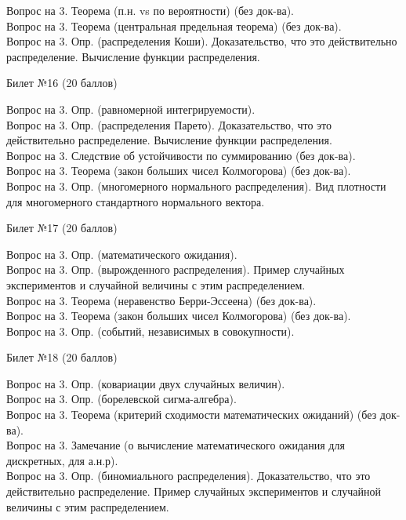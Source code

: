 \documentclass[preview]{standalone}
\begin{document}
Вопрос на 3.  Теорема (п.н. vs по вероятности)  (без док-ва). \\
Вопрос на 3.  Теорема (центральная предельная теорема) (без док-ва). \\
Вопрос на 3.  Опр. (распределения Коши). Доказательство, что это действительно распределение. Вычисление функции распределения. \\
\begin{center} {\Large Билет №16 (20 баллов)} \end{center}
Вопрос на 3.  Опр. (равномерной интегрируемости). \\
Вопрос на 3.  Опр. (распределения Парето). Доказательство, что это действительно распределение. Вычисление функции распределения. \\
Вопрос на 3.  Следствие об устойчивости по суммированию (без док-ва). \\
Вопрос на 3.  Теорема (закон больших чисел Колмогорова) (без док-ва). \\
Вопрос на 3.  Опр. (многомерного нормального распределения). Вид плотности для многомерного стандартного нормального вектора. \\ 
\begin{center} {\Large Билет №17 (20 баллов)} \end{center}
Вопрос на 3.  Опр. (математического ожидания). \\
Вопрос на 3.  Опр. (вырожденного распределения). Пример случайных экспериментов и случайной величины с этим распределением. \\
Вопрос на 3.  Теорема (неравенство Берри-Эссеена) (без док-ва). \\
Вопрос на 3.  Теорема (закон больших чисел Колмогорова) (без док-ва). \\
Вопрос на 3.  Опр. (событий, независимых в совокупности). \\
\begin{center} {\Large Билет №18 (20 баллов)} \end{center}
Вопрос на 3.  Опр. (ковариации двух случайных величин). \\
Вопрос на 3.  Опр. (борелевской сигма-алгебра). \\
Вопрос на 3. Теорема (критерий сходимости математических ожиданий) (без док-ва). \\
Вопрос на 3.  Замечание (о вычисление  математического ожидания для дискретных, для а.н.р). \\
Вопрос на 3.  Опр. (биномиального распределения). Доказательство, что это действительно распределение. Пример случайных экспериментов и случайной величины с этим распределением. \\     
\end{document}
